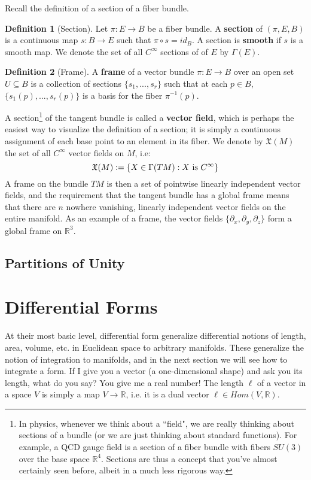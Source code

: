 \documentclass[11pt, oneside]{article}   	%
\theoremstyle{definition}
\newtheorem{definition}{Definition}[section]
\begin{document}
Recall the definition of a section of a fiber bundle.
\begin{definition}[Section]
	Let $\pi : E\rightarrow B$ be a fiber bundle. A \textbf{section} of $(\pi, E, B)$ is a continuous map $s : B\rightarrow E$ 
	such that $\pi\circ s = id_B$. A section is \textbf{smooth} if $s$ is a smooth map. We denote the set of all $C^\infty$ 
	sections of of $E$ by $\Gamma(E)$. 
\end{definition}
\begin{definition}[Frame]
	A \textbf{frame} of a vector bundle $\pi : E\rightarrow B$ over an open set $U\subseteq B$ is a collection of sections 
	$\{s_1, ..., s_r\}$ such that at each $p\in B$, $\{s_1(p), ..., s_r(p)\}$ is a basis for the fiber $\pi^{-1}(p)$. 
\end{definition}
A section\footnote{In physics, whenever we think about a ``field", we are really thinking about sections of a bundle (or we are 
just thinking about standard functions). For example, a QCD gauge field is a section of a fiber bundle with fibers $SU(3)$ over 
the base space $\mathbb R^4$. Sections are thus a concept that you've almost certainly seen before, albeit in a much less 
rigorous way.} of the tangent bundle is called a \textbf{vector field}, which is perhaps the easiest way to visualize the definition 
of a section; it is simply a continuous assignment of each base point to an element in its fiber. We denote by $\mathfrak X(M)$ 
the set of all $C^\infty$ vector fields on $M$, i.e: 
\begin{equation}
	\mathfrak X(M) := \{X\in \Gamma(TM) : X\textnormal{ is } C^\infty\}
\end{equation}
A frame on the bundle 
$TM$ is then a set of pointwise linearly independent vector fields, and the requirement that the tangent bundle has a global 
frame means that there are $n$ nowhere vanishing, linearly independent vector fields on the entire manifold. As an 
example of a frame, the vector fields $\{\partial_x, \partial_y, \partial_z\}$ form a global frame on $\mathbb R^3$. 

\subsection{Partitions of Unity}

\section{Differential Forms}

At their most basic level, differential form generalize differential notions of length, area, volume, etc. in Euclidean space to 
arbitrary manifolds. These generalize the notion of integration to manifolds, and in the next section we will see how to integrate 
a form. If I give you a vector (a one-dimensional shape) and ask you its length, what do you say? You give me a real number! 
The length $\ell$ of a vector in a space $V$ is simply a map $V\rightarrow\mathbb R$, i.e. it is a dual vector $\ell\in Hom(V, 
\mathbb R)$. 
\end{document}
